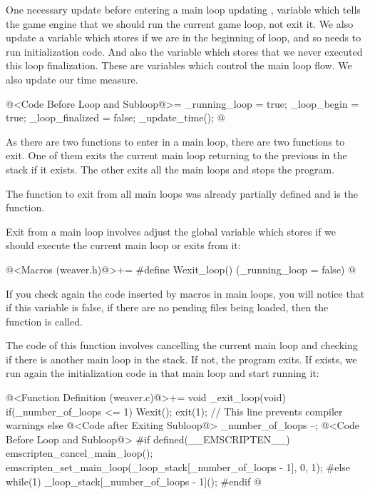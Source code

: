 One necessary update before entering a main loop updating
, variable which tells the game engine
that we should run the current game loop, not exit it. We also update
a variable which stores if we are in the beginning of loop, and so
needs to run initialization code. And also the variable which stores
that we never executed this loop finalization. These are variables
which control the main loop flow. We also update our time measure.

\iniciocodigo
@<Code Before Loop and Subloop@>=
_running_loop = true;
_loop_begin = true;
_loop_finalized = false;
_update_time();
@
\fimcodigo


As there are two functions to enter in a main loop, there are two
functions to exit. One of them exits the current main loop returning
to the previous in the stack if it exists. The other exits all the
main loops and stops the program.

The function to exit from all main loops was already partially defined
and is the  function.

Exit from a main loop involves adjust the global variable which stores
if we should execute the current main loop or exits from it:

\iniciocodigo
@<Macros (weaver.h)@>+=
#define Wexit_loop() (_running_loop = false)
@
\fimcodigo

If you check again the code inserted by macros in main loops, you will
notice that if this variable is false, if there are no pending files
being loaded, then the function  is called.

The code of this function involves cancelling the current main loop
and checking if there is another main loop in the stack. If not, the
program exits.  If exists, we run again the initialization code in
that main loop and start running it:

\iniciocodigo
@<Function Definition (weaver.c)@>+=
void _exit_loop(void){
  if(_number_of_loops <= 1){
    Wexit();
    exit(1); // This line prevents compiler warnings
  }
  else{
    @<Code after Exiting Subloop@>
    _number_of_loops --;
    @<Code Before Loop and Subloop@>
#if defined(__EMSCRIPTEN__)
    emscripten_cancel_main_loop();
    emscripten_set_main_loop(_loop_stack[_number_of_loops - 1], 0, 1);
#else
    while(1)
      _loop_stack[_number_of_loops - 1]();
#endif
  }
}
@
\fimcodigo


